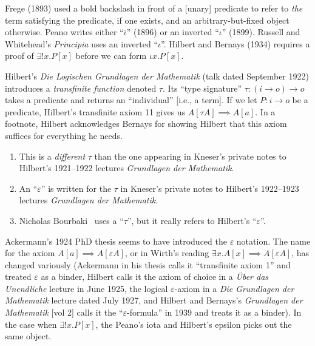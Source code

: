 \begin{node}[History]\label{epsilon-calc-0002}%

\begin{node}\label{epsilon-calc-0003}%
Frege (1893) used a bold backslash in front of a [unary] predicate to
refer to \emph{the} term satisfying the predicate, if one exists, and an
arbitrary-but-fixed object otherwise. Peano writes either
``$\overline{\iota}$'' (1896) or an inverted ``$\iota$'' (1899). Russell
and Whitehead's \textit{Principia} uses an inverted ``$\iota$''. Hilbert
and Bernays (1934) requires a proof of $\exists!x.P[x]$ before we can
form $\iota x.P[x]$.
\end{node}

\begin{node}\label{epsilon-calc-0004}%
Hilbert's \textit{Die Logischen Grundlagen der Mathematik} (talk dated
September 1922) introduces a \emph{transfinite  function} denoted $\tau$.
Its ``type signature'' $\tau\colon(i\to o)\to o$ takes a predicate and
returns an ``individual'' [i.e., a term]. If we let $P\colon i\to o$
be a predicate, Hilbert's transfinite axiom 11 gives us
$A[\tau A]\implies A[a]$.
In a footnote, Hilbert acknowledges Bernays for showing Hilbert that
this axiom suffices for everything he needs.

\begin{node}[Caution]\label{epsilon-calc-0005}%
\begin{enumerate}
\item This is a \emph{different} $\tau$ than the one appearing in
  Kneser's private notes to Hilbert's 1921--1922 lectures
  \textit{Grundlagen der Mathematik}.
\item An ``$\varepsilon$'' is written for the $\tau$ in Kneser's
  private notes to Hilbert's 1922--1923 lectures
  \textit{Grundlagen der Mathematik}.
\item Nicholas Bourbaki~\cite{bourbaki1968theory} uses a ``$\tau$'', but
  it really refers to Hilbert's ``$\varepsilon$''.
\end{enumerate}
\end{node}
\end{node}

\begin{node}\label{epsilon-calc-0006}%
Ackermann's 1924 PhD thesis seems to have introduced the $\varepsilon$
notation. The name for the axiom $A[a]\implies A[\varepsilon A]$, or in
Wirth's reading $\exists x.A[x]\implies A[\varepsilon A]$, has
changed variously (Ackermann in his thesis calls it ``transfinite axiom 1'' and
treated $\varepsilon$ as a binder, Hilbert calls it the axiom of choice
in a \textit{\"{U}ber das Unendliche} lecture in June 1925,
the logical $\varepsilon$-axiom in a
\textit{Die Grundlagen der Mathematik} lecture dated July 1927, and Hilbert and
Bernays's \textit{Grundlagen der Mathematik} [vol 2] calls it the ``$\varepsilon$-formula'' in 1939 and treats it as
a binder). In the case when $\exists!x.P[x]$, the Peano's iota and
Hilbert's epsilon picks out the same object.
\end{node}
\end{node}

